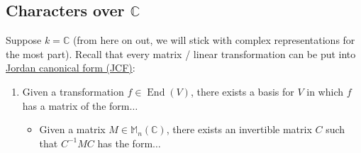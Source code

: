 \documentclass[12pt]{article}
\newcommand{\cx}{\mathbb{C}}
\newcommand\inv[1]{#1^{-1}}
\theoremstyle{definition}
\DeclareMathOperator\End{End}
\newcommand{\m}{\mathbb{M}}
\begin{document}
\subsection{Characters over \texorpdfstring{$\cx$}{C}}
Suppose $k = \cx$ (from here on out, we will stick with complex representations for the most part). Recall that every matrix / linear transformation can be put into \underline{Jordan canonical form (JCF)}:
\begin{enumerate}
    \item Given a transformation $f \in \End(V)$, there exists a basis for $V$ in which $f$ has a matrix of the form$\dotsc$
    \begin{itemize}
        \item Given a matrix $M \in \m_n(\cx)$, there exists an invertible matrix $C$ such that $\inv{C} M C$ has the form$\dotsc$
        

\end{itemize}
\end{enumerate}
\end{document}
